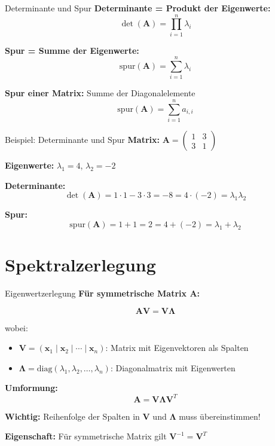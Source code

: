 \documentclass[a4paper, fontsize=7pt]{scrartcl}
\begin{document}
\begin{mainbox}{Determinante und Spur}
\textbf{Determinante = Produkt der Eigenwerte:}
$$\det(\mathbf{A}) = \prod_{i=1}^{n} \lambda_i$$

\textbf{Spur = Summe der Eigenwerte:}
$$\text{spur}(\mathbf{A}) = \sum_{i=1}^{n} \lambda_i$$

\textbf{Spur einer Matrix:} Summe der Diagonalelemente
$$\text{spur}(\mathbf{A}) = \sum_{i=1}^{n} a_{i,i}$$
\end{mainbox}

\begin{subbox}{Beispiel: Determinante und Spur}
\textbf{Matrix:} $\mathbf{A} = \begin{pmatrix} 1 & 3 \\ 3 & 1 \end{pmatrix}$

\textbf{Eigenwerte:} $\lambda_1 = 4$, $\lambda_2 = -2$

\textbf{Determinante:}
$$\det(\mathbf{A}) = 1 \cdot 1 - 3 \cdot 3 = -8 = 4 \cdot (-2) = \lambda_1 \lambda_2$$

\textbf{Spur:}
$$\text{spur}(\mathbf{A}) = 1 + 1 = 2 = 4 + (-2) = \lambda_1 + \lambda_2$$
\end{subbox}

\section{Spektralzerlegung}

\begin{mainbox}{Eigenwertzerlegung}
\textbf{Für symmetrische Matrix $\mathbf{A}$:}

$$\mathbf{AV} = \mathbf{V\Lambda}$$

wobei:
\begin{itemize}
    \item $\mathbf{V} = (\mathbf{x}_1 \mid \mathbf{x}_2 \mid \cdots \mid \mathbf{x}_n)$: Matrix mit Eigenvektoren als Spalten
    \item $\mathbf{\Lambda} = \text{diag}(\lambda_1, \lambda_2, \ldots, \lambda_n)$: Diagonalmatrix mit Eigenwerten
\end{itemize}

\textbf{Umformung:}
$$\mathbf{A} = \mathbf{V\Lambda V}^T$$

\textbf{Wichtig:} Reihenfolge der Spalten in $\mathbf{V}$ und $\mathbf{\Lambda}$ muss übereinstimmen!

\textbf{Eigenschaft:} Für symmetrische Matrix gilt $\mathbf{V}^{-1} = \mathbf{V}^T$
\end{mainbox}
\end{document}

